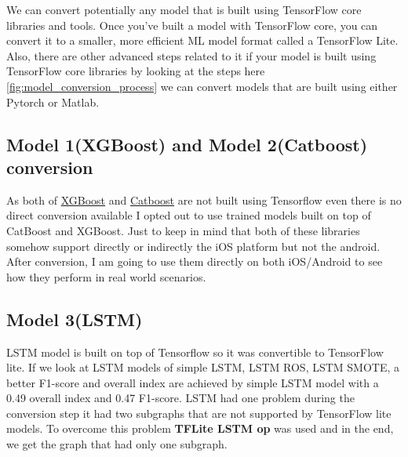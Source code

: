  We can convert potentially any model that is built using TensorFlow core libraries and tools. Once you've built a model with TensorFlow core, you can convert it to a smaller, more efficient ML model format called a TensorFlow Lite. Also, there are other advanced steps related to it if your model is built using TensorFlow core libraries by looking at the steps here  \ref{fig:model_conversion_process} we can convert models that are built using either Pytorch or Matlab. 
 
 
\subsection{Model 1(XGBoost) and Model 2(Catboost) conversion}\label{5CTLM1M2}

As both of \href{https://xgboost.readthedocs.io}{XGBoost} and \href{https://catboost.ai}{Catboost} are not built using Tensorflow even there is no direct conversion available I opted out to use trained models built on top of CatBoost and XGBoost. Just to keep in mind that both of these libraries somehow support directly or indirectly the iOS platform but not the android. After conversion, I am going to use them directly on both iOS/Android to see how they perform in real world scenarios. 

\subsection{Model 3(LSTM)}\label{5CTLM3}

LSTM model is built on top of Tensorflow so it was convertible to TensorFlow lite. If we look at LSTM models of simple LSTM, LSTM ROS, LSTM SMOTE, a better F1-score and overall index are achieved by simple LSTM model with a 0.49 overall index and 0.47 F1-score. LSTM had one problem during the conversion step it had two subgraphs that are not supported by TensorFlow lite models. To overcome this problem \textbf{TFLite LSTM op } was used and in the end, we get the graph that had only one subgraph.


